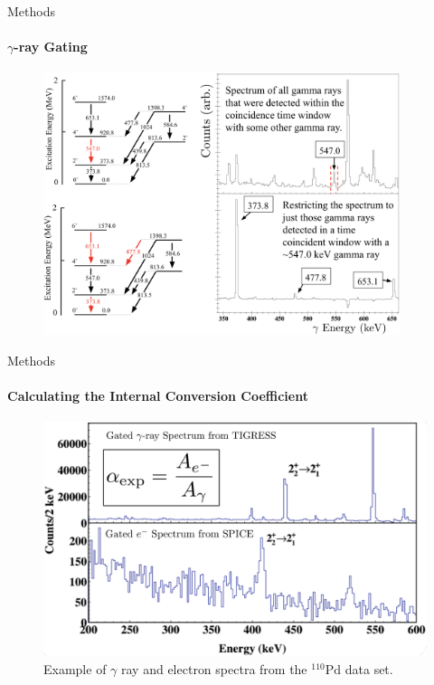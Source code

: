 \documentclass{beamer}
\begin{document}

\begin{frame}{Methods}
\framesubtitle{$\gamma$-ray Gating}
\begin{figure}[!hht]
  \centering
  \includegraphics[width=0.93\textwidth, keepaspectratio]{CombinedGating.png}
  \label{GatedSpectra}
\end{figure}
\end{frame}




\begin{frame}{Methods}
\framesubtitle{Calculating the Internal Conversion Coefficient}
\begin{figure}[!hht]
  \centering
  \includegraphics[width=\textwidth, keepaspectratio]{JTSStack.png}
  \caption{Example of $\gamma$ ray and electron spectra from the $^{110}\mathrm{Pd}$ data set.}
  \label{comparison}
\end{figure}
\end{frame}
\end{document}
